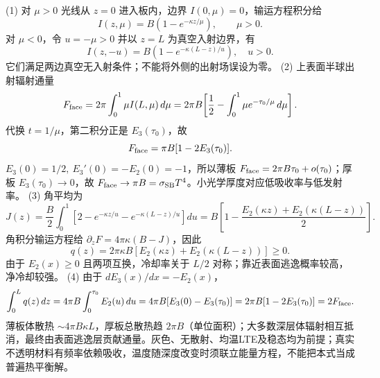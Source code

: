 (1) 对 \(\mu>0\) 光线从 \(z=0\) 进入板内，边界 \(I(0,\mu)=0\)，输运方程积分给
\[
I(z,\mu)=B(1-e^{-\kappa z/\mu}),\qquad\mu>0.
\]
对 \(\mu<0\)，令 \(u=-\mu>0\) 并以 \(z=L\) 为真空入射边界，有
\[
I(z,-u)=B(1-e^{-\kappa(L-z)/u}),\quad u>0.
\]
它们满足两边真空无入射条件；不能将外侧的出射场误设为零。
(2) 上表面半球出射辐射通量
\[
F_{\rm face}=2\pi\int_0^1\mu I(L,\mu)\,d\mu
=2\pi B\!\left[\frac12-\int_0^1\mu e^{-\tau_0/\mu}\,d\mu\right].
\]
代换 \(t=1/\mu\)，第二积分正是 \(E_3(\tau_0)\)，故
\[
F_{\rm face}=\pi B[1-2E_3(\tau_0)].
\]
\(E_3(0)=1/2,\ E_3'(0)=-E_2(0)=-1\)，所以薄板 \(F_{\rm face}=2\pi B\tau_0+o(\tau_0)\)；厚板 \(E_3(\tau_0)\to0\)，故 \(F_{\rm face}\to\pi B=\sigma_{\rm SB}T^4\)。小光学厚度对应低吸收率与低发射率。
(3) 角平均为
\[
J(z)=\frac B2\int_0^1\left[2-e^{-\kappa z/u}-e^{-\kappa(L-z)/u}\right]du
=B\left[1-\frac{E_2(\kappa z)+E_2(\kappa(L-z))}{2}\right].
\]
角积分输运方程给 \(\partial_zF=4\pi\kappa(B-J)\)，因此
\[
q(z)=2\pi\kappa B[E_2(\kappa z)+E_2(\kappa(L-z))]\ge0.
\]
由于 \(E_2(x)\ge0\) 且两项互换，冷却率关于 \(L/2\) 对称；靠近表面逃逸概率较高，净冷却较强。
(4) 由于 \(dE_3(x)/dx=-E_2(x)\)，
\[
\int_0^Lq(z)\,dz
=4\pi B\int_0^{\tau_0}E_2(u)\,du
=4\pi B[E_3(0)-E_3(\tau_0)]
=2\pi B[1-2E_3(\tau_0)]=2F_{\rm face}.
\]
薄板体散热 \(\sim4\pi B\kappa L\)，厚板总散热趋 \(2\pi B\)（单位面积）；大多数深层体辐射相互抵消，最终由表面逃逸层贡献通量。灰色、无散射、均温LTE及稳态均为前提；真实不透明材料有频率依赖吸收，温度随深度改变时须联立能量方程，不能把本式当成普遍热平衡解。
